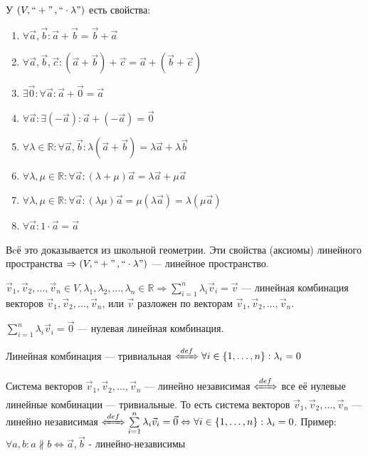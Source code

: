 У \((V, ``+" \,, ``\cdot \lambda")\) есть свойства:
\begin{enumerate}
    \item \(\forall \vec a, \vec b: \vec a + \vec b = \vec b + \vec a\)
    \item \(\forall \vec a, \vec b, \vec c: (\vec a + \vec b) + \vec c = \vec a + (\vec b + \vec c)\)
    \item \(\exists \vec 0: \forall \vec a: \vec a + \vec0 = \vec a\)
    \item \(\forall \vec a: \exists (- \vec a): \vec a+(- \vec a) = \vec 0\)
    \item \(\forall \lambda \in \mathbb R: \forall \vec a, \vec b: \lambda (\vec a + \vec b) = \lambda \vec a + \lambda \vec b\)
    \item \(\forall \lambda, \mu \in \mathbb R: \forall \vec a: (\lambda + \mu)\vec a = \lambda \vec a + \mu \vec a\)
    \item \(\forall \lambda, \mu \in \mathbb R: \forall \vec a: (\lambda \mu)\vec a = \mu(\lambda \vec a) = \lambda (\mu \vec a )\)
    \item \(\forall \vec a: 1 \cdot \vec a = \vec a\)
\end{enumerate}

Вcё это доказывается из школьной геометрии. Эти свойства (аксиомы) линейного пространства \(\Rightarrow (V, ``+" \,, ``\cdot \lambda")\) --- линейное пространство.

\(
\vec v_1, \vec v_2, \dots, \vec v_n \in V , 
    \lambda_1, \lambda_2, \dots, \lambda_n \in \mathbb{R}
\Rightarrow \sum\limits_{i = 1}^{n} \lambda_i \vec v_i = \vec v\) --- линейная комбинация векторов \(\vec v_1, \vec v_2, \dots, \vec v_n\), или \(\vec v\) разложен по векторам \(\vec v_1, \vec v_2, \dots, \vec v_n\).

\(\sum\limits_{i = 1}^{n} \lambda_i \vec v_i = \vec 0\) --- нулевая линейная комбинация.

Линейная комбинация --- тривиальная \(\defLeftrightarrow \forall i \in \{1, \dots, n\}: \lambda_i = 0\)

Система векторов \(\vec v_1, \vec v_2, \dots, \vec v_n\) --- линейно независимая \(\defLeftrightarrow\) все её нулевые линейные комбинации --- тривиальные. То есть система векторов \(\vec v_1, \vec v_2, \dots, \vec v_n\) --- линейно независимая \(\defLeftrightarrow \sum\limits_{i = 1}^{n} \lambda_i \vec v_i = \vec 0 \Leftrightarrow \forall i \in \{1, \dots, n\}: \lambda_i = 0\). Пример: \(\forall a, b : a \nparallel b \Leftrightarrow \vec a, \vec b\) - линейно-независимы

